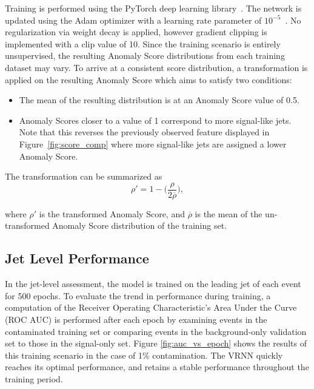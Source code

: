 \documentclass[11pt, a4paper]{article}
\begin{document}
Training is performed using the {\sc PyTorch} deep learning library~\cite{pytorch}. The network is updated using the Adam optimizer with a learning rate parameter of $10^{-5}$~\cite{kingma2017adam}. No regularization via weight decay is applied, however gradient clipping is implemented with a clip value of 10. Since the training scenario is entirely unsupervised, the resulting Anomaly Score distributions from each training dataset may vary. To arrive at a consistent score distribution, a transformation is applied on the resulting Anomaly Score which aims to satisfy two conditions:

\begin{itemize}
	\item{The mean of the resulting distribution is at an Anomaly Score value of 0.5.}
	\item{Anomaly Scores closer to a value of 1 correspond to more signal-like jets. Note that this reverses the previously observed feature displayed in Figure~\ref{fig:score_comp} where more signal-like jets are assigned a lower Anomaly Score.}
\end{itemize}

The transformation can be summarized as
\begin{equation}
\label{eq:transformation}
	\rho ' = 1 - \bigg(\frac{\rho}{2\overline{\rho}}\bigg),
\end{equation}

where $\rho '$ is the transformed Anomaly Score, and  $\overline{\rho}$ is the mean of the un-transformed Anomaly Score distribution of the training set.


\subsection{Jet Level Performance}

In the jet-level assessment, the model is trained on the leading jet of each event for 500 epochs. To evaluate the trend in performance during training, a computation of the Receiver Operating Characteristic's Area Under the Curve (ROC AUC) is performed after each epoch by examining events in the contaminated training set or comparing events in the background-only validation set to those in the signal-only set. Figure \ref{fig:auc_vs_epoch} shows the results of this training scenario in the case of 1\% contamination. The VRNN quickly reaches its optimal performance, and retains a stable performance throughout the training period. 
\end{document}
